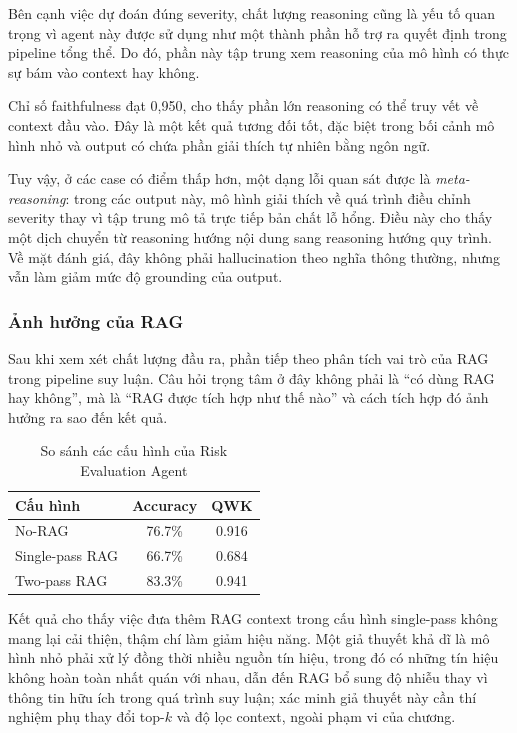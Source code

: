 Bên cạnh việc dự đoán đúng severity, chất lượng reasoning cũng là yếu tố quan trọng vì agent này được sử dụng như một thành phần hỗ trợ ra quyết định trong pipeline tổng thể. Do đó, phần này tập trung xem reasoning của mô hình có thực sự bám vào context hay không.

Chỉ số faithfulness đạt 0{,}950, cho thấy phần lớn reasoning có thể truy vết về context đầu vào. Đây là một kết quả tương đối tốt, đặc biệt trong bối cảnh mô hình nhỏ và output có chứa phần giải thích tự nhiên bằng ngôn ngữ.

Tuy vậy, ở các case có điểm thấp hơn, một dạng lỗi quan sát được là \textit{meta-reasoning}: trong các output này, mô hình giải thích về quá trình điều chỉnh severity thay vì tập trung mô tả trực tiếp bản chất lỗ hổng. Điều này cho thấy một dịch chuyển từ reasoning hướng nội dung sang reasoning hướng quy trình. Về mặt đánh giá, đây không phải hallucination theo nghĩa thông thường, nhưng vẫn làm giảm mức độ grounding của output.

\subsubsection*{Ảnh hưởng của RAG}

Sau khi xem xét chất lượng đầu ra, phần tiếp theo phân tích vai trò của RAG trong pipeline suy luận. Câu hỏi trọng tâm ở đây không phải là ``có dùng RAG hay không'', mà là ``RAG được tích hợp như thế nào'' và cách tích hợp đó ảnh hưởng ra sao đến kết quả.

\begin{table}[!htb]
\centering
\begin{tabular}{l c c}
\hline
Cấu hình & Accuracy & QWK \\
\hline
No-RAG & 76.7\% & 0.916 \\
Single-pass RAG & 66.7\% & 0.684 \\
Two-pass RAG & 83.3\% & 0.941 \\
\hline
\end{tabular}
\caption{So sánh các cấu hình của Risk Evaluation Agent}
\label{tab:risk_rag_ablation}
\end{table}

Kết quả cho thấy việc đưa thêm RAG context trong cấu hình single-pass không mang lại cải thiện, thậm chí làm giảm hiệu năng. Một giả thuyết khả dĩ là mô hình nhỏ phải xử lý đồng thời nhiều nguồn tín hiệu, trong đó có những tín hiệu không hoàn toàn nhất quán với nhau, dẫn đến RAG bổ sung độ nhiễu thay vì thông tin hữu ích trong quá trình suy luận; xác minh giả thuyết này cần thí nghiệm phụ thay đổi top-$k$ và độ lọc context, ngoài phạm vi của chương.

